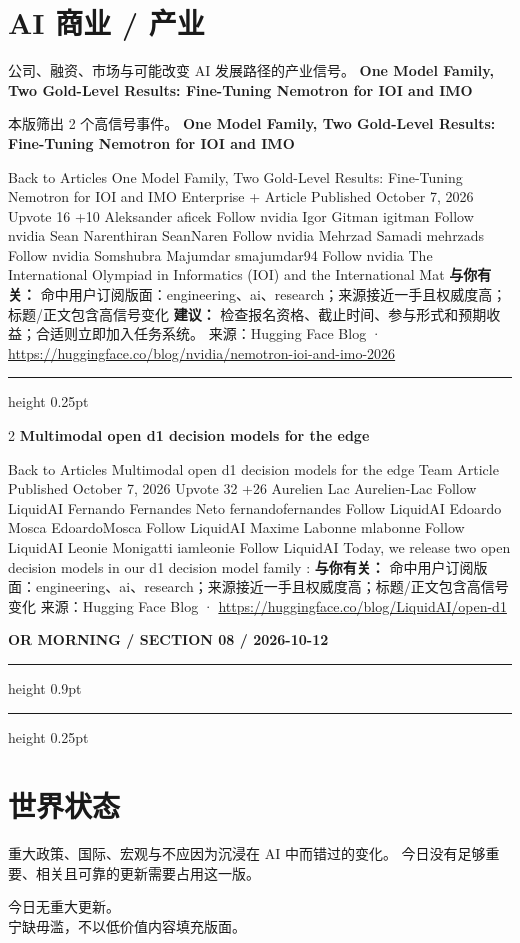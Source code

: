 \documentclass[10.5pt]{ctexart}
\begin{document}
\section*{AI 商业 / 产业}
{\color{ormuted} 公司、融资、市场与可能改变 AI 发展路径的产业信号。}
\vspace{2mm}
{\LARGE\bfseries One Model Family, Two Gold-Level Results: Fine-Tuning Nemotron for IOI and IMO}\par
\vspace{1mm}
{\color{ormuted} 本版筛出 2 个高信号事件。}
\vspace{3mm}
{\Large\bfseries One Model Family, Two Gold-Level Results: Fine-Tuning Nemotron for IOI and IMO}\par
Back to Articles One Model Family, Two Gold-Level Results: Fine-Tuning Nemotron for IOI and IMO Enterprise + Article Published October 7, 2026 Upvote 16 +10 Aleksander aficek Follow nvidia Igor Gitman igitman Follow nvidia Sean Narenthiran SeanNaren Follow nvidia Mehrzad Samadi mehrzads Follow nvidia Somshubra Majumdar smajumdar94 Follow nvidia The International Olympiad in Informatics (IOI) and the International Mat
\textbf{与你有关：} 命中用户订阅版面：engineering、ai、research；来源接近一手且权威度高；标题/正文包含高信号变化
\textbf{建议：} 检查报名资格、截止时间、参与形式和预期收益；合适则立即加入任务系统。
{\footnotesize\color{ormuted} 来源：Hugging Face Blog · \url{https://huggingface.co/blog/nvidia/nemotron-ioi-and-imo-2026}}
\vspace{4mm}
\hrule height 0.25pt
\vspace{3mm}
\begin{multicols}{2}
{\large\bfseries Multimodal open d1 decision models for the edge}\par
Back to Articles Multimodal open d1 decision models for the edge Team Article Published October 7, 2026 Upvote 32 +26 Aurelien Lac Aurelien-Lac Follow LiquidAI Fernando Fernandes Neto fernandofernandes Follow LiquidAI Edoardo Mosca EdoardoMosca Follow LiquidAI Maxime Labonne mlabonne Follow LiquidAI Leonie Monigatti iamleonie Follow LiquidAI Today, we release two open decision models in our d1 decision model family :
\textbf{与你有关：} 命中用户订阅版面：engineering、ai、research；来源接近一手且权威度高；标题/正文包含高信号变化
{\footnotesize\color{ormuted} 来源：Hugging Face Blog · \url{https://huggingface.co/blog/LiquidAI/open-d1}}
\end{multicols}
\newpage
{\small\bfseries OR MORNING / SECTION 08 / 2026-10-12}
\vspace{2mm}
\hrule height 0.9pt
\vspace{1.5mm}
\hrule height 0.25pt
\vspace{4mm}
\section*{世界状态}
{\color{ormuted} 重大政策、国际、宏观与不应因为沉浸在 AI 中而错过的变化。}
\vspace{2mm}
{\color{ormuted} 今日没有足够重要、相关且可靠的更新需要占用这一版。}
\vspace{3mm}
\vfill\begin{center}\Large 今日无重大更新。\\[2mm]\normalsize 宁缺毋滥，不以低价值内容填充版面。\end{center}\vfill
\end{document}
